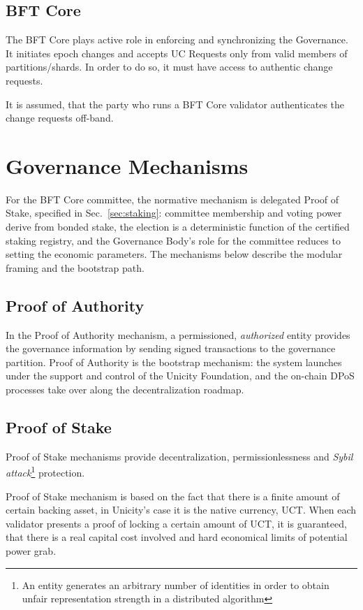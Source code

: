 \section{BFT Core}

The BFT Core plays active role in enforcing and synchronizing the Governance. It initiates epoch changes and accepts UC Requests only from valid members of partitions/shards. In order to do so, it must have access to authentic change requests.

It is assumed, that the party who runs a BFT Core validator authenticates the change requests off-band.

\chapter{Governance Mechanisms}

For the BFT Core committee, the normative mechanism is delegated Proof of Stake, specified in Sec.~\ref{sec:staking}: committee membership and voting power derive from bonded stake, the election is a deterministic function of the certified staking registry, and the Governance Body's role for the committee reduces to setting the economic parameters. The mechanisms below describe the modular framing and the bootstrap path.

\section{Proof of Authority}

In the Proof of Authority mechanism, a permissioned, \emph{authorized} entity provides the governance information by sending signed transactions to the governance partition. Proof of Authority is the bootstrap mechanism: the system launches under the support and control of the Unicity Foundation, and the on-chain DPoS processes take over along the decentralization roadmap.

\section{Proof of Stake}

Proof of Stake mechanisms provide decentralization, permissionlessness and \emph{Sybil attack}\footnote{An entity generates an arbitrary number of identities in order to obtain unfair representation strength in a distributed algorithm} protection.

Proof of Stake mechanism is based on the fact that there is a finite amount of certain backing asset, in Unicity's case it is the native currency, UCT. When each validator presents a proof of locking a certain amount of UCT, it is guaranteed, that there is a real capital cost involved and hard economical limits of potential power grab.

